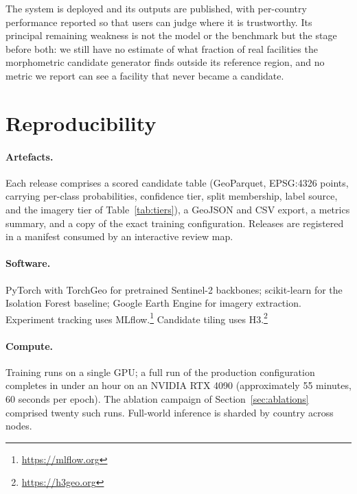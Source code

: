 \documentclass[11pt,a4paper]{article}
\begin{document}
The system is deployed and its outputs are published, with per-country
performance reported so that users can judge where it is trustworthy. Its
principal remaining weakness is not the model or the benchmark but the stage
before both: we still have no estimate of what fraction of real facilities the
morphometric candidate generator finds outside its reference region, and no
metric we report can see a facility that never became a candidate.

\appendix
\section{Reproducibility}

\paragraph{Artefacts.} Each release comprises a scored candidate table
(GeoParquet, EPSG:4326 points, carrying per-class probabilities, confidence
tier, split membership, label source, and the imagery tier of
Table~\ref{tab:tiers}), a GeoJSON and CSV export, a metrics summary, and a copy
of the exact training configuration. Releases are registered in a manifest
consumed by an interactive review map.

\paragraph{Software.} PyTorch \citep{paszke2019pytorch} with TorchGeo
\citep{stewart2022torchgeo} for pretrained Sentinel-2 backbones; scikit-learn
\citep{pedregosa2011sklearn} for the Isolation Forest baseline; Google Earth
Engine \citep{gorelick2017gee} for imagery extraction. Experiment tracking uses
MLflow.\footnote{\url{https://mlflow.org}} Candidate tiling uses
H3.\footnote{\url{https://h3geo.org}}

\paragraph{Compute.} Training runs on a single GPU; a full run of the production
configuration completes in under an hour on an NVIDIA RTX 4090 (approximately
55 minutes, 60 seconds per epoch). The ablation campaign of
Section~\ref{sec:ablations} comprised twenty such runs. Full-world inference is
sharded by country across nodes.
\end{document}
